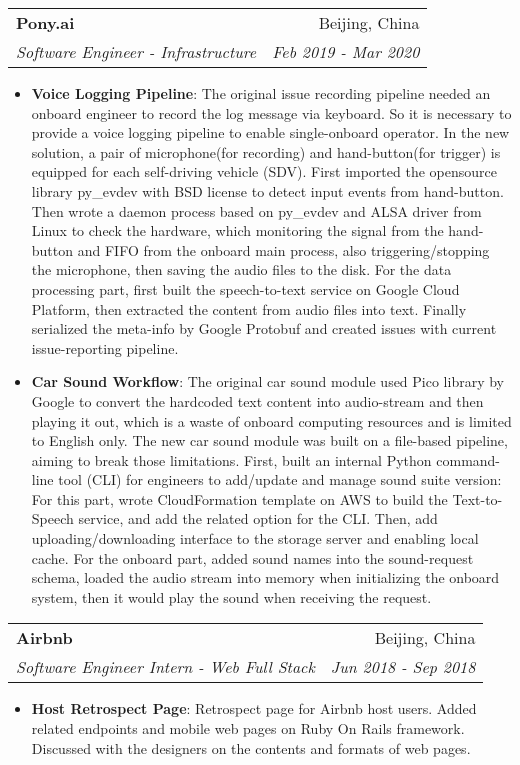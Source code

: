 \documentclass[letterpaper,11pt]{article}
\makeatletter
\newcommand{\resumeItem}[2]{
	\item\small{
		\textbf{#1}{: #2 \vspace{-2pt}}
	}
}
\newcommand{\resumeSubheading}[4]{
	\vspace{-1pt}\item
	\begin{tabular*}{0.97\textwidth}[t]{l@{\extracolsep{\fill}}r}
		\textbf{#1} & #2 \\
		\textit{\small#3} & \textit{\small #4} \\
	\end{tabular*}\vspace{-5pt}
}
\newcommand{\resumeSubSubheading}[2]{
	\begin{tabular*}{0.97\textwidth}{l@{\extracolsep{\fill}}r}
		\textit{\small#1} & \textit{\small #2} \\
	\end{tabular*}\vspace{-5pt}
}
\newcommand{\resumeSubHeadingListEnd}{\end{itemize}}
\newcommand{\resumeItemListStart}{\begin{itemize}}
\newcommand{\resumeItemListEnd}{\end{itemize}\vspace{-5pt}}
\makeatother
\begin{document}
\begin{spacing}{0.87}
	\resumeSubheading
	{Pony.ai}{Beijing, China}
	{Software Engineer - Infrastructure}{Feb 2019 - Mar 2020}
	\resumeItemListStart
	\resumeItem{Voice Logging Pipeline}
	{The original issue recording pipeline needed an onboard engineer to record the log message via keyboard. So it is necessary to provide a voice logging pipeline to enable single-onboard operator. In the new solution, a pair of microphone(for recording) and hand-button(for trigger) is equipped for each self-driving vehicle (SDV). First imported the opensource library py\_evdev with BSD license to detect input events from hand-button. Then wrote a daemon process based on py\_evdev and ALSA driver from Linux to check the hardware, which monitoring the signal from the hand-button and FIFO from the onboard main process, also triggering/stopping the microphone, then saving the audio files to the disk. For the data processing part, first built the speech-to-text service on Google Cloud Platform, then extracted the content from audio files into text. Finally serialized the meta-info by Google Protobuf and created issues with current issue-reporting pipeline.}
	\resumeItem{Car Sound Workflow}
	{The original car sound module used Pico library by Google to convert the hardcoded text content into audio-stream and then playing it out, which is a waste of onboard computing resources and is limited to English only. The new car sound module was built on a file-based pipeline, aiming to break those limitations. First, built an internal Python command-line tool (CLI) for engineers to add/update and manage sound suite version: For this part, wrote CloudFormation template on AWS to build the Text-to-Speech service, and add the related option for the CLI. Then, add uploading/downloading interface to the storage server and enabling local cache. For the onboard part, added sound names into the sound-request schema, loaded the audio stream into memory when initializing the onboard system, then it would play the sound when receiving the request.}
	\resumeItemListEnd

	
	
	
	\resumeSubheading
	{Airbnb}{Beijing, China}
	{Software Engineer Intern - Web Full Stack}{Jun 2018 - Sep 2018}
	\resumeItemListStart
	\resumeItem{Host Retrospect Page}
	{Retrospect page for Airbnb host users. Added related endpoints and mobile web pages on Ruby On Rails framework. Discussed with the designers on the contents and formats of web pages.}
	\resumeItemListEnd
	

\end{spacing}
\end{document}
